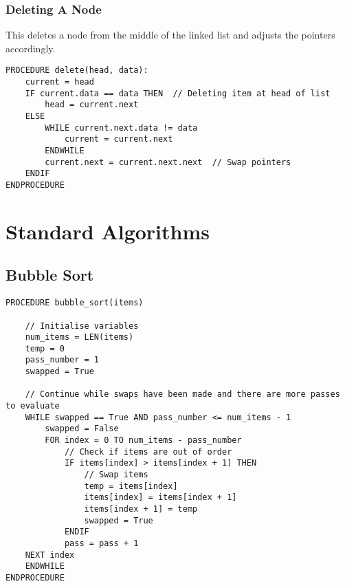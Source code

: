 \documentclass[a4paper,11pt]{article}
\begin{document}
\subsubsection{Deleting A Node}
This deletes a node from the middle of the linked list and adjusts the pointers accordingly.
\begin{Verbatim}[breaklines=true, breakanywhere=true]
PROCEDURE delete(head, data):
    current = head
    IF current.data == data THEN  // Deleting item at head of list
        head = current.next
    ELSE
        WHILE current.next.data != data
            current = current.next
        ENDWHILE
        current.next = current.next.next  // Swap pointers
    ENDIF
ENDPROCEDURE
\end{Verbatim}

\section{Standard Algorithms}
\subsection{Bubble Sort}
\begin{Verbatim}[breaklines=true, breakanywhere=true]
PROCEDURE bubble_sort(items)

    // Initialise variables
    num_items = LEN(items)
    temp = 0
    pass_number = 1
    swapped = True
  
    // Continue while swaps have been made and there are more passes to evaluate
    WHILE swapped == True AND pass_number <= num_items - 1
        swapped = False
    	FOR index = 0 TO num_items - pass_number     
       	    // Check if items are out of order
            IF items[index] > items[index + 1] THEN
            	// Swap items
            	temp = items[index]
            	items[index] = items[index + 1]
            	items[index + 1] = temp
                swapped = True
            ENDIF
            pass = pass + 1
	NEXT index
    ENDWHILE
ENDPROCEDURE 
\end{Verbatim}
\end{document}
